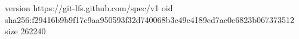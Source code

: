 version https://git-lfs.github.com/spec/v1
oid sha256:f29416b9b9f17c9aa950593f32d740068b3c49c4189ed7ac0e6823b067373512
size 262240
